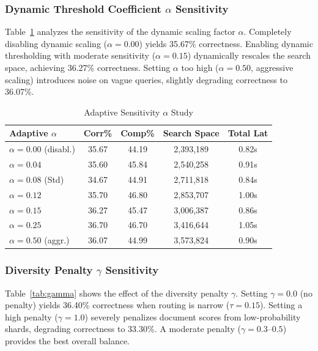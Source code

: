 \documentclass[conference]{IEEEtran}
\begin{document}
\subsubsection{Dynamic Threshold Coefficient \texorpdfstring{$\alpha$}{Alpha} Sensitivity}
Table~\ref{tab:alpha} analyzes the sensitivity of the dynamic scaling factor $\alpha$. Completely disabling dynamic scaling ($\alpha=0.00$) yields 35.67\% correctness. Enabling dynamic thresholding with moderate sensitivity ($\alpha=0.15$) dynamically rescales the search space, achieving 36.27\% correctness. Setting $\alpha$ too high ($\alpha=0.50$, aggressive scaling) introduces noise on vague queries, slightly degrading correctness to 36.07\%.

\begin{table}[htbp]
\caption{Adaptive Sensitivity $\alpha$ Study}
\label{tab:alpha}
\begin{center}
\footnotesize
\setlength{\tabcolsep}{4pt}
\begin{tabular}{lcccc}
\toprule
\textbf{Adaptive $\alpha$} & \textbf{Corr\%} & \textbf{Comp\%} & \textbf{Search Space} & \textbf{Total Lat} \\
\midrule
$\alpha=0.00$ (disabl.) & 35.67 & 44.19 & 2,393,189 & 0.82s \\
$\alpha=0.04$ & 35.60 & 45.84 & 2,540,258 & 0.91s \\
$\alpha=0.08$ (Std) & 34.67 & 44.91 & 2,711,818 & 0.84s \\
$\alpha=0.12$ & 35.70 & 46.80 & 2,853,707 & 1.00s \\
$\alpha=0.15$ & 36.27 & 45.47 & 3,006,387 & 0.86s \\
$\alpha=0.25$ & 36.70 & 46.70 & 3,416,644 & 1.05s \\
$\alpha=0.50$ (aggr.) & 36.07 & 44.99 & 3,573,824 & 0.90s \\
\bottomrule
\end{tabular}
\end{center}
\end{table}

\subsubsection{Diversity Penalty \texorpdfstring{$\gamma$}{Gamma} Sensitivity}
Table~\ref{tab:gamma} shows the effect of the diversity penalty $\gamma$. Setting $\gamma=0.0$ (no penalty) yields 36.40\% correctness when routing is narrow ($\tau=0.15$). Setting a high penalty ($\gamma=1.0$) severely penalizes document scores from low-probability shards, degrading correctness to 33.30\%. A moderate penalty ($\gamma=0.3$--$0.5$) provides the best overall balance.
\end{document}
